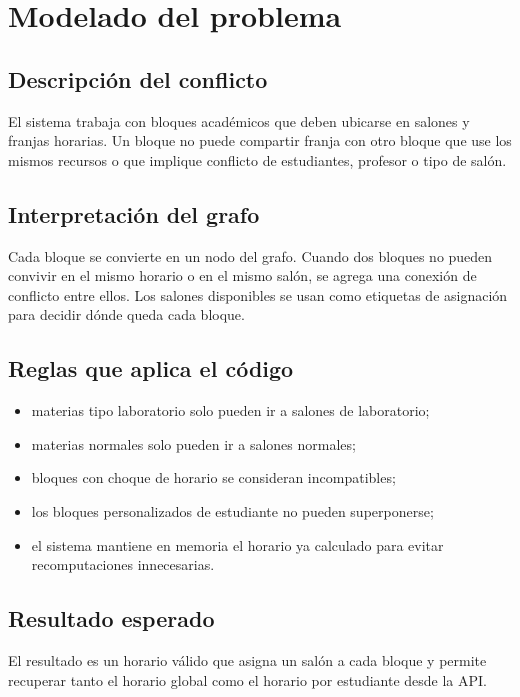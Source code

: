 \chapter{Modelado del problema}

\section{Descripción del conflicto}

El sistema trabaja con bloques académicos que deben ubicarse en salones y franjas horarias. Un bloque no puede compartir franja con otro bloque que use los mismos recursos o que implique conflicto de estudiantes, profesor o tipo de salón.

\section{Interpretación del grafo}

Cada bloque se convierte en un nodo del grafo. Cuando dos bloques no pueden convivir en el mismo horario o en el mismo salón, se agrega una conexión de conflicto entre ellos. Los salones disponibles se usan como etiquetas de asignación para decidir dónde queda cada bloque.

\section{Reglas que aplica el código}

\begin{itemize}[leftmargin=1.5cm]
  \item materias tipo laboratorio solo pueden ir a salones de laboratorio;
  \item materias normales solo pueden ir a salones normales;
  \item bloques con choque de horario se consideran incompatibles;
  \item los bloques personalizados de estudiante no pueden superponerse;
  \item el sistema mantiene en memoria el horario ya calculado para evitar recomputaciones innecesarias.
\end{itemize}

\section{Resultado esperado}

El resultado es un horario válido que asigna un salón a cada bloque y permite recuperar tanto el horario global como el horario por estudiante desde la API.
